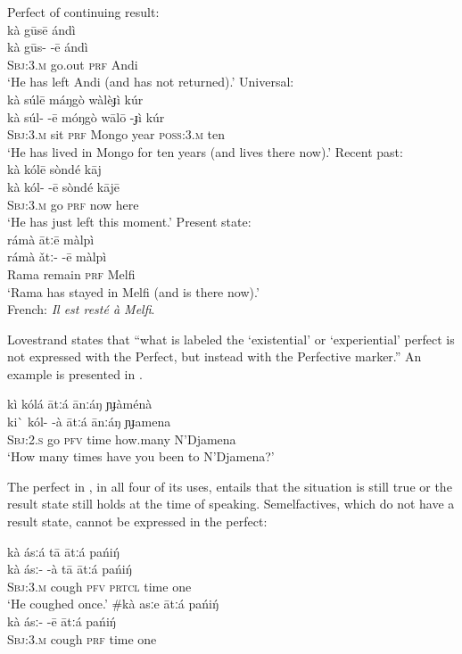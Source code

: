 \ea \label{ex:22.25}
\ea  Perfect of continuing result:\\
\glll kà  gūsē  {}  ándì\\
kà  gūs-  -ē  ándì\\
\textsc{Sbj:3.m}  go.out  \textsc{prf}  Andi\\
\glt ‘He has left Andi (and has not returned).’
\ex   Universal:\\
\glll kà  súlē  {}  máŋgò  wàlèɟì  {}  kúr\\
kà  súl-  -ē  móŋgò  wālō  -ɟì   kúr\\
\textsc{Sbj:3.m}  sit  \textsc{prf}  Mongo  year  \textsc{poss:3.m}  ten\\
\glt ‘He has lived in Mongo for ten years (and lives there now).’
\ex   Recent past:\\
\glll kà  kólē  {}  sòndé  kāj\\
kà  kól-  -ē  sòndé  kājē\\
\textsc{Sbj:3.m}  go  \textsc{prf}  now  here\\
\glt ‘He has just left this moment.’
\pagebreak\ex   Present state:\\
\glll rámà  ātːē  {}  màlpì\\
rámà  ǎtː-  -ē  màlpì\\
Rama  remain  \textsc{prf}  Melfi\\
\glt ‘Rama has stayed in Melfi (and is there now).’\\
{French}: \textit{Il est resté à Melfi}.
\z \z


Lovestrand states that “what is labeled the ‘existential’ or ‘experiential’ perfect is not expressed with the Perfect, but instead with the Perfective marker.” An example is presented in .


\ea \label{ex:22.26}
\glll kì  kólá  {}  ātːá  ānːáŋ  ɲɟàménà\\
ki\`{}   kól-  -à  ātːá  ānːáŋ  ɲɟamena\\
\textsc{Sbj:2.s}  go  \textsc{pfv}  time  how.many  N’Djamena\\
\glt ‘How many times have you been to N’Djamena?’
\z


The perfect in , in all four of its uses, entails that the situation is still true or the result state still holds at the time of speaking. Semelfactives, which do not have a result state, cannot be expressed in the perfect:


\ea \label{ex:22.27}
\ea \glll  kà  ásːá  {}  tā  ātːá  pańiŋ́ \\
kà  ásː-  -à  tā  ātːá  pańiŋ́ \\
\textsc{Sbj:3.m}  cough  \textsc{pfv}  \textsc{prtcl}  time  one\\
\glt ‘He coughed once.’
\ex \glll  \#kà  asːe  {}  ātːá  pańiŋ́ \\ 
  kà  ásː-  -ē  ātːá  pańiŋ́ \\
\textsc{Sbj:3.m}  cough  \textsc{prf}  time  one\\
\z \z



